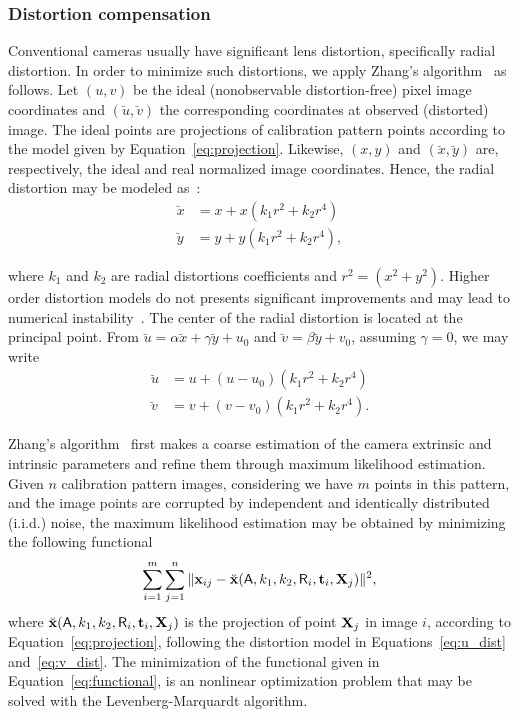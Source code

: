 \subsubsection{Distortion compensation}\label{sec:Zhang}
%
Conventional cameras usually have significant lens distortion, specifically radial distortion.
In order to minimize such distortions, we apply Zhang's algorithm~\cite{Zhang2000a} as follows.
%
Let $(u,v)$ be the ideal (nonobservable distortion-free) pixel image coordinates and
$(\breve{u},\breve{v})$ the corresponding coordinates at observed (distorted) image.
The ideal points are projections of calibration pattern points according to the model given by Equation~\eqref{eq:projection}.
Likewise, $(x,y)$ and $(\breve{x},\breve{y})$ are, respectively, the ideal and real normalized image coordinates.
Hence, the radial distortion may be modeled as~\cite{Zhang2000a}:
%
\begin{align}
 \breve{x} &= x + x(k_1 r^2 + k_2 r^4) \\%
 \breve{y} &= y + y(k_1 r^2 + k_2 r^4), %
\end{align}


%
where $k_1$ and $k_2$ are radial distortions coefficients and $r^2 = (x^2 + y^2)$.
Higher order distortion models do not presents significant improvements and may lead to numerical instability~\cite{Zhang2000a}.
The center of the radial distortion is located at the principal point.
From
$\breve{u} = \alpha \breve{x} + \gamma \breve{y} + u_0 $ and $\breve{v} = \beta \breve{y} + v_0$, assuming $\gamma = 0$,
we may write
%
\begin{align}
  \label{eq:u_dist}
  \breve{u} &= u + (u-u_0)(k_1 r^2 + k_2 r^4 ) \\
  \label{eq:v_dist}
  \breve{v} &= v + (v-v_0)(k_1 r^2 + k_2 r^4 ).
\end{align}

Zhang's algorithm~\cite{Zhang2000}
first makes a coarse estimation of the camera extrinsic and intrinsic parameters and refine them through maximum likelihood estimation.
Given $n$ calibration pattern images, considering we have $m$ points in this pattern, and the image points are corrupted by independent and identically distributed (i.i.d.) noise,
the maximum likelihood estimation may be obtained by minimizing the following functional~\cite{Zhang2000a}
%
\begin{equation}
  \sum_{i=1}^{m}\sum_{j=1}^{n} \Vert \mathbf{x}_{ij} - \breve{\mathbf{x}}(\mathsf{A}, k_1, k_2, \mathsf{R}_i, \mathbf{t}_i, \mathbf{X}_j) \Vert^2
 \label{eq:functional},
\end{equation}
where $\breve{\mathbf{x}}(\mathsf{A}, k_1, k_2, \mathsf{R}_i, \mathbf{t}_i, \mathbf{X}_j)$ is the projection of point $\mathbf{X}_j$ in image $i$, according to Equation~\eqref{eq:projection},
following the distortion model in Equations~\eqref{eq:u_dist} and~\eqref{eq:v_dist}.
The minimization of the functional given in Equation~\eqref{eq:functional}, is an nonlinear optimization problem that may be solved with the Levenberg-Marquardt algorithm.

